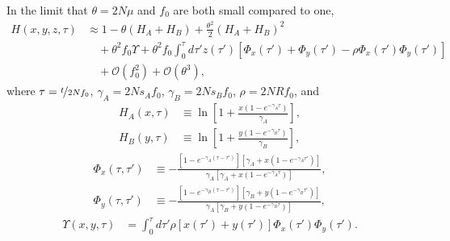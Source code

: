 \documentclass[11pt]{article}
\begin{document}
In the limit that $\theta = 2N\mu$ and $f_0$ are both small compared to one, 
\begin{align}\label{eq:h_expansion}
    H(x, y, z, \tau) &\approx 1 -\theta (H_A + H_B)
    + \frac{\theta^2}{2}\left(H_A + H_B\right)^2 \\\nonumber
    &\quad + \theta^2f_0\Upsilon + \theta^2f_0\int_0^{\tau}d \tau' z(\tau') \left[\Phi_x(\tau')+\Phi_y(\tau')-\rho\Phi_x(\tau')\Phi_y(\tau')\right] \\\nonumber
    &\quad + \mathcal{O}(f_0^2) +\mathcal{O}(\theta^3),
\end{align}
where $\tau = \nicefrac{t}{2Nf_0}$, $\gamma_A = 2Ns_Af_0$, $\gamma_B = 2Ns_Bf_0$, $\rho = 2NRf_0$, and 
\begin{subequations}\begin{align}
    H_A(x, \tau) &\equiv \ln \left[1 + \frac{x(1-e^{-\gamma_A\tau})}{\gamma_A}\right], \\
    H_B(y, \tau) &\equiv \ln \left[1 + \frac{y(1-e^{-\gamma_B\tau})}{\gamma_B}\right],
\end{align}\end{subequations}
\begin{subequations}\begin{align}
    \Phi_x(\tau, \tau') &\equiv -\frac{[ 1-e^{-\gamma_A (\tau-\tau')} ][\gamma_A+x(1-e^{-\gamma_A \tau'})]}{\gamma_A \left[ \gamma_A+x(1-e^{-\gamma_A \tau}) \right]}, \\
    \Phi_y(\tau,\tau') &\equiv -\frac{[1-e^{-\gamma_B (\tau-\tau')}][\gamma_B+y(1-e^{-\gamma_B \tau'})]}{\gamma_A \left[ \gamma_B+y(1-e^{-\gamma_B \tau}) \right]},
\end{align}\end{subequations}
\begin{align}
    \Upsilon(x, y, \tau) &= \int_0^{\tau} d\tau' \rho \left[x(\tau') + y(\tau')\right]\Phi_x(\tau')\Phi_y(\tau').
\end{align}
\end{document}
